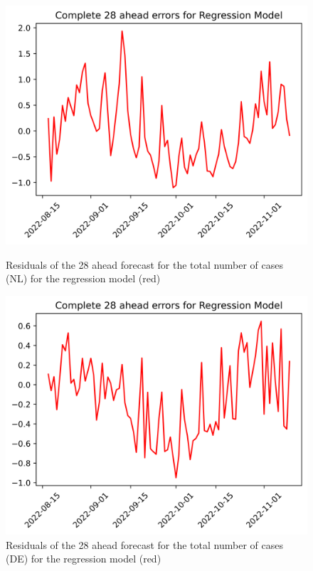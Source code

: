 \begin{figure}

\begin{minipage}{.45\textwidth}
  \centering
  \includegraphics[width=\linewidth]{pics/28_ah/28_ahead_errors_Regression Model.png}
  \caption{Residuals of the 28 ahead forecast for the total number of cases (NL) for the regression model (red)}
  \label{fig:tot_cases_error_28_RM}
\end{minipage}
\begin{minipage}{.45\textwidth}
  \centering
  \includegraphics[width=\linewidth]{pics/28_ah/DE_28_ahead_errors_Regression Model.png}
  \caption{Residuals of the 28 ahead forecast for the total number of cases (DE) for the regression model (red)}
  \label{fig:tot_cases_error_28_RM_DE}
\end{minipage}

\end{figure}
